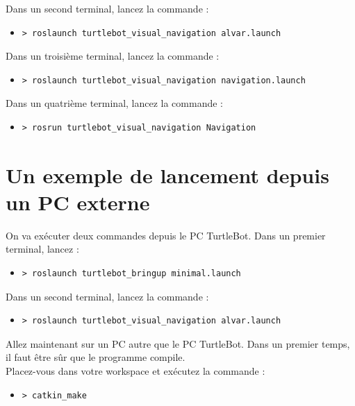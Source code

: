 \documentclass[10pt,a4paper]{article}
\begin{document}
Dans un second terminal, lancez la commande :
\begin{itemize}
\item[] \begin{verbatim}> roslaunch turtlebot_visual_navigation alvar.launch \end{verbatim}
\end{itemize}

Dans un troisième terminal, lancez la commande :
\begin{itemize}
\item[] \begin{verbatim}> roslaunch turtlebot_visual_navigation navigation.launch \end{verbatim}
\end{itemize}

Dans un quatrième terminal, lancez la commande :
\begin{itemize}
\item[] \begin{verbatim}> rosrun turtlebot_visual_navigation Navigation \end{verbatim}
\end{itemize}

\section{Un exemple de lancement depuis un PC externe}

On va exécuter deux commandes depuis le PC TurtleBot. Dans un premier terminal, lancez :
\begin{itemize}
\item[] \begin{verbatim}> roslaunch turtlebot_bringup minimal.launch \end{verbatim}
\end{itemize}

Dans un second terminal, lancez la commande :
\begin{itemize}
\item[] \begin{verbatim}> roslaunch turtlebot_visual_navigation alvar.launch \end{verbatim}
\end{itemize}

\vspace{0.5cm}
Allez maintenant sur un PC autre que le PC TurtleBot. Dans un premier temps, il faut être sûr que le programme compile. \\
Placez-vous dans votre workspace et exécutez la commande :
\begin{itemize}
\item[] \begin{verbatim}> catkin_make \end{verbatim}
\end{itemize}
\end{document}

